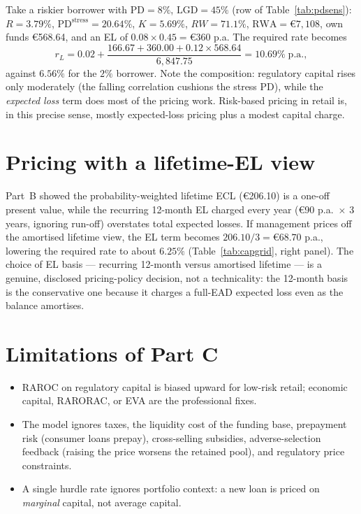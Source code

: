 \documentclass[11pt,a4paper]{report}
\renewcommand{\EUR}[1]{\euro#1}
\theoremstyle{definition}
\theoremstyle{plain}
\newcommand{\PD}{\mathrm{PD}}
\newcommand{\LGD}{\mathrm{LGD}}
\newcommand{\RWA}{\mathrm{RWA}}
\begin{document}
Take a riskier borrower with $\PD=8\%$, $\LGD=45\%$ (row of
Table~\ref{tab:pdsens}): $R=3.79\%$, $\PD^{\text{stress}}=20.64\%$,
$K=5.69\%$, $RW=71.1\%$, $\RWA=\EUR{7{,}108}$, own funds
\EUR{568.64}, and an EL of $0.08\times0.45=\EUR{360}$ p.a. The
required rate becomes
\begin{equation}
  r_L=0.02+\frac{166.67+360.00+0.12\times 568.64}{6{,}847.75}
  =10.69\%\;\text{p.a.},
\end{equation}
against $6.56\%$ for the $2\%$ borrower. Note the composition:
regulatory capital rises only moderately (the falling correlation
cushions the stress PD), while the \emph{expected loss} term does most
of the pricing work. Risk-based pricing in retail is, in this precise
sense, mostly expected-loss pricing plus a modest capital charge.

\section{Pricing with a lifetime-EL view}

Part~B showed the probability-weighted lifetime ECL
(\EUR{206.10}) is a one-off present value, while the recurring
12-month EL charged every year (\EUR{90} p.a.\ $\times$ 3 years,
ignoring run-off) overstates total expected losses. If management
prices off the amortised lifetime view, the EL term becomes
$206.10/3=\EUR{68.70}$ p.a., lowering the required rate to about
$6.25\%$ (Table~\ref{tab:capgrid}, right panel). The choice of EL
basis --- recurring 12-month versus amortised lifetime --- is a
genuine, disclosed pricing-policy decision, not a technicality: the
12-month basis is the conservative one because it charges a full-EAD
expected loss even as the balance amortises.

\section{Limitations of Part C}

\begin{itemize}
\item RAROC on regulatory capital is biased upward for low-risk
      retail; economic capital, RARORAC, or EVA are the professional
      fixes.
\item The model ignores taxes, the liquidity cost of the funding base,
      prepayment risk (consumer loans prepay), cross-selling
      subsidies, adverse-selection feedback (raising the price worsens
      the retained pool), and regulatory price constraints.
\item A single hurdle rate ignores portfolio context: a new loan is
      priced on \emph{marginal} capital, not average capital.
\end{itemize}
\end{document}

